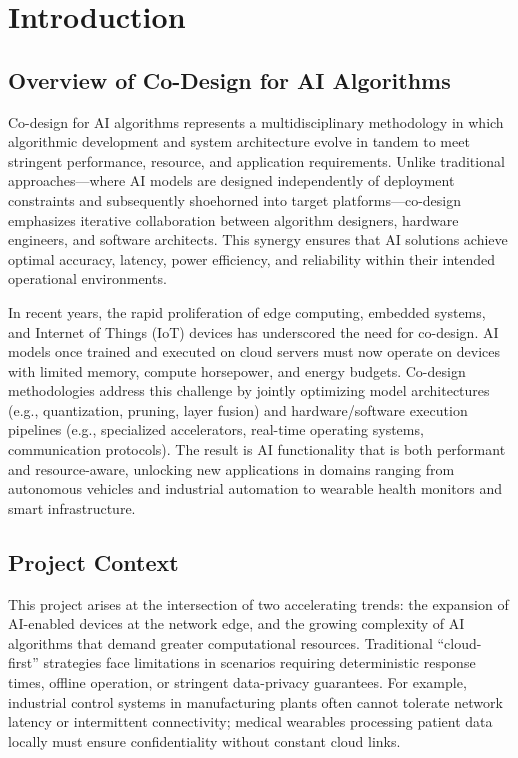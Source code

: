 \chapter{Introduction}

\section{Overview of Co-Design for AI Algorithms}

Co-design for AI algorithms represents a multidisciplinary methodology in which algorithmic development and system architecture evolve in tandem to meet stringent performance, resource, and application requirements. Unlike traditional approaches—where AI models are designed independently of deployment constraints and subsequently shoehorned into target platforms—co-design emphasizes iterative collaboration between algorithm designers, hardware engineers, and software architects. This synergy ensures that AI solutions achieve optimal accuracy, latency, power efficiency, and reliability within their intended operational environments.

In recent years, the rapid proliferation of edge computing, embedded systems, and Internet of Things (IoT) devices has underscored the need for co-design. AI models once trained and executed on cloud servers must now operate on devices with limited memory, compute horsepower, and energy budgets. Co-design methodologies address this challenge by jointly optimizing model architectures (e.g., quantization, pruning, layer fusion) and hardware/software execution pipelines (e.g., specialized accelerators, real-time operating systems, communication protocols). The result is AI functionality that is both performant and resource-aware, unlocking new applications in domains ranging from autonomous vehicles and industrial automation to wearable health monitors and smart infrastructure.

\section{Project Context}

This project arises at the intersection of two accelerating trends: the expansion of AI-enabled devices at the network edge, and the growing complexity of AI algorithms that demand greater computational resources. Traditional “cloud-first” strategies face limitations in scenarios requiring deterministic response times, offline operation, or stringent data-privacy guarantees. For example, industrial control systems in manufacturing plants often cannot tolerate network latency or intermittent connectivity; medical wearables processing patient data locally must ensure confidentiality without constant cloud links.

